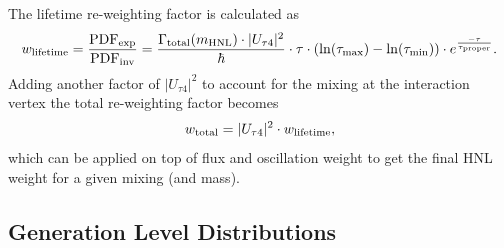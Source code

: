 The lifetime re-weighting factor is calculated as
\begin{equation}
    w_\mathrm{lifetime} = \frac{\mathrm{PDF}_\mathrm{exp}}{\mathrm{PDF}_\mathrm{inv}} = \frac{\Gamma_\mathrm{total}(m_\mathrm{HNL}) \cdot |U_{\tau4}|^2}{\hbar} \cdot \tau \cdot (\ln(\tau_\mathrm{max}) - \ln(\tau_\mathrm{min})) \cdot e^{\frac{-\tau}{\tau_\mathrm{proper}}}.
    \labeq{weight_lifetime}
\end{equation}
Adding another factor of $|U_{\tau4}|^2$ to account for the mixing at the interaction vertex the total re-weighting factor becomes
\begin{equation}
    w_\mathrm{total} = |U_{\tau4}|^2 \cdot w_\mathrm{lifetime},
    \labeq{weight_full}
\end{equation}
which can be applied on top of flux and oscillation weight to get the final HNL weight for a given mixing (and mass).

\subsection{Generation Level Distributions}
